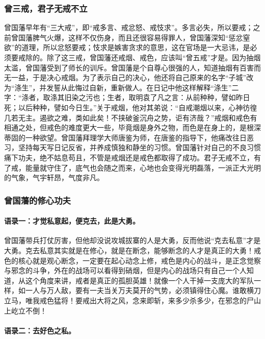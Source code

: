 \subsubsection{曾三戒，君子无戒不立}

曾国藩早年有“三大戒”，即“戒多言、戒忿怒、戒忮求”。多言必失，所以要戒；之前曾国藩脾气火爆，这样不仅伤身，而且还很容易得罪人，曾国藩深知“惩忿窒欲”的道理，所以忿怒要戒；忮求是嫉害贪求的意思，这在官场是一大忌讳，是必须要戒除的。除了这三戒，曾国藩还戒烟、戒色，应该叫“曾五戒”才是。因为抽烟太滥，曾国藩受到了师长的训斥。曾国藩是个自尊心很强的人，知道抽烟有百害而无一益，于是决心戒烟。为了表示自己的决心，他还将自己原来的名字“子城”改为“涤生”，并发誓从此悔过自新，重新做人。在日记中他这样解释“涤生”二字：“涤者，取涤其旧染之污也；生者，取明袁了凡之言：从前种种，譬如昨日死；以后种种，譬如今日生。”关于戒烟，他对其弟说：“自戒潮烟以来，心神彷徨几若无主。遏欲之难，类如此矣！不挟破釜沉舟之势，讵有济哉？”戒烟和戒色有相通之处，但戒色的难度更大一些，毕竟烟是身外之物，而色是在身上的，是根深蒂固的一种欲望。曾国藩拜理学大师唐鉴为师，在唐鉴的指导下，他痛改往日恶习，坚持每天写日记反省，并养成慎独和静坐的习惯。曾国藩针对自己的不良习惯痛下功夫，绝不姑息苟且，不管是戒烟还是戒色都取得了成功。君子无戒不立，有了戒，能量就守住了，底气也会随之而来，心地也会变得光明磊落，一派正大光明的气象，气宇轩昂，气度非凡。

\subsubsection{曾国藩的修心功夫}

\paragraph{语录一：才觉私意起，便克去，此是大勇。}

曾国藩带兵打仗厉害，但他却没说攻城拔寨的人是大勇，反而他说“克去私意”才是大勇。克去私意其实就是在修心，就是在断念，能够断念的人才是真正的大勇！戒色的核心就是观心断念，一定要在起心动念上修，戒色是内心的战斗，是正念觉察与邪念的斗争，外在的战场可以看得到硝烟，但是内心的战场只有自己一个人知道，从这个角度来讲，戒者是真正的孤胆英雄！就像一个人干掉一支庞大的军队一样，如一人与万人敌，要有一夫当关万夫莫开的气势，必须镇得住心魔。谁敢横刀立马，唯我戒色猛将！要戒出大将之风，念来即斩，来多少杀多少，在邪念的尸山上屹立不倒！

\paragraph{语录二：去好色之私。}

